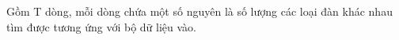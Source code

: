 Gồm T dòng, mỗi dòng chứa một số nguyên là số lượng các loại đàn khác nhau tìm được tương ứng với bộ dữ liệu vào.